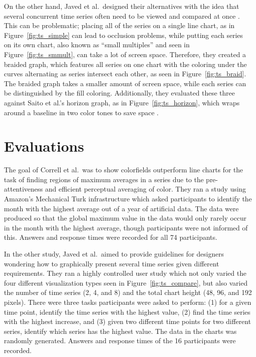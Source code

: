 \documentclass{article} %
\begin{document}
On the other hand, Javed et al.\ designed their alternatives with the idea that several concurrent time series often need to be viewed and compared at once \cite{javed2010}.  This can be problematic; placing all of the series on a single line chart, as in Figure~\ref{fig:ts_simple} can lead to occlusion problems, while putting each series on its own chart, also known as ``small multiples'' and seen in Figure~\ref{fig:ts_smmult}, can take a lot of screen space.  Therefore, they created a braided graph, which features all series on one chart with the coloring under the curves alternating as series intersect each other, as seen in Figure~\ref{fig:ts_braid}.  The braided graph takes a smaller amount of screen space, while each series can be distinguished by the fill coloring.  Additionally, they evaluated these three against Saito et al.'s horizon graph, as in Figure~\ref{fig:ts_horizon}, which wraps around a baseline in two color tones to save space \cite{saito2005}.

\section{Evaluations}

The goal of Correll et al.\ was to show colorfields outperform line charts for the task of finding regions of maximum averages in a series due to the pre-attentiveness and efficient perceptual averaging of color.  They ran a study using Amazon's Mechanical Turk infrastructure which asked participants to identify the month with the highest average out of a year of artificial data.  The data were produced so that the global maximum value in the data would only rarely occur in the month with the highest average, though participants were not informed of this. Answers and response times were recorded for all 74 participants.

In the other study, Javed et al.\ aimed to provide guidelines for designers wondering how to graphically present several time series given different requirements.  They ran a highly controlled user study which not only varied the four different visualization types seen in Figure~\ref{fig:ts_compare}, but also varied the number of time series (2, 4, and 8) and the total chart height (48, 96, and 192 pixels).  There were three tasks participants were asked to perform: (1) for a given time point, identify the time series with the highest value, (2) find the time series with the highest increase, and (3) given two different time points for two different series, identify which series has the highest value.  The data in the charts was randomly generated.  Answers and response times of the 16 participants were recorded.
\end{document}
